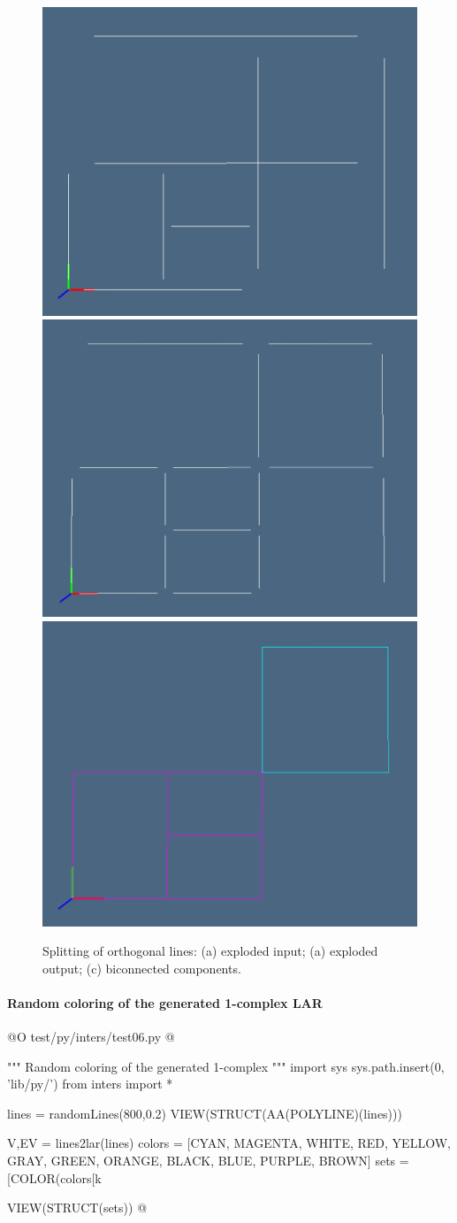 \documentclass[11pt,oneside]{article}    %
\begin{document}
\begin{figure}[htbp] %
   \centering
   \includegraphics[height=0.25\linewidth,width=0.325\linewidth]{images/ortho1} 
   \includegraphics[height=0.25\linewidth,width=0.325\linewidth]{images/ortho2} 
   \includegraphics[height=0.25\linewidth,width=0.325\linewidth]{images/ortho3} 
   \caption{Splitting of orthogonal lines: (a) exploded input; (a) exploded output; (c) biconnected components.}
   \label{fig:ortho}
\end{figure}



\paragraph{Random coloring of the generated 1-complex LAR}
@O test/py/inters/test06.py
@{""" Random coloring of the generated 1-complex """
import sys
sys.path.insert(0, 'lib/py/')
from inters import *

lines = randomLines(800,0.2)
VIEW(STRUCT(AA(POLYLINE)(lines)))

V,EV = lines2lar(lines)
colors = [CYAN, MAGENTA, WHITE, RED, YELLOW, GRAY, GREEN, ORANGE, BLACK, BLUE, PURPLE, BROWN]
sets = [COLOR(colors[k%

VIEW(STRUCT(sets))
@}
\end{document}
